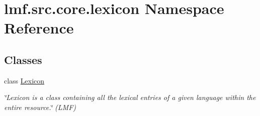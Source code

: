 \hypertarget{namespacelmf_1_1src_1_1core_1_1lexicon}{\section{lmf.\+src.\+core.\+lexicon Namespace Reference}
\label{namespacelmf_1_1src_1_1core_1_1lexicon}
}
\subsection*{Classes}
\begin{DoxyCompactItemize}
\item 
class \hyperlink{classlmf_1_1src_1_1core_1_1lexicon_1_1_lexicon}{Lexicon}
\begin{DoxyCompactList}\small\item\em \char`\"{}\+Lexicon is a class containing all the lexical entries of a given language within the entire resource.\char`\"{} (L\+M\+F) \end{DoxyCompactList}\end{DoxyCompactItemize}
